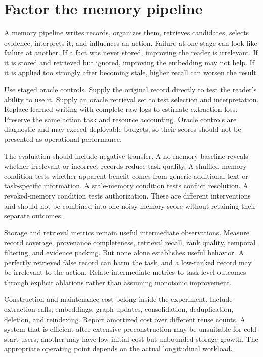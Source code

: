 \section{Factor the memory pipeline}\label{sec:C27:pipeline}
A memory pipeline writes records, organizes them, retrieves candidates, selects evidence, interprets it, and influences an action. Failure at one stage can look like failure at another. If a fact was never stored, improving the reader is irrelevant. If it is stored and retrieved but ignored, improving the embedding may not help. If it is applied too strongly after becoming stale, higher recall can worsen the result.

Use staged oracle controls. Supply the original record directly to test the reader's ability to use it. Supply an oracle retrieval set to test selection and interpretation. Replace learned writing with complete raw logs to estimate extraction loss. Preserve the same action task and resource accounting. Oracle controls are diagnostic and may exceed deployable budgets, so their scores should not be presented as operational performance.

The evaluation should include negative transfer. A no-memory baseline reveals whether irrelevant or incorrect records reduce task quality. A shuffled-memory condition tests whether apparent benefit comes from generic additional text or task-specific information. A stale-memory condition tests conflict resolution. A revoked-memory condition tests authorization. These are different interventions and should not be combined into one noisy-memory score without retaining their separate outcomes.

Storage and retrieval metrics remain useful intermediate observations. Measure record coverage, provenance completeness, retrieval recall, rank quality, temporal filtering, and evidence packing. But none alone establishes useful behavior. A perfectly retrieved false record can harm the task, and a low-ranked record may be irrelevant to the action. Relate intermediate metrics to task-level outcomes through explicit ablations rather than assuming monotonic improvement.

Construction and maintenance cost belong inside the experiment. Include extraction calls, embeddings, graph updates, consolidation, deduplication, deletion, and reindexing. Report amortized cost over different reuse counts. A system that is efficient after extensive preconstruction may be unsuitable for cold-start users; another may have low initial cost but unbounded storage growth. The appropriate operating point depends on the actual longitudinal workload.

